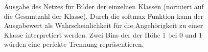 \begin{figure}[h!]
  \hspace{8pt}
  \hspace{8pt}
  \caption{Ausgabe des Netzes für Bilder der einzelnen Klassen (normiert auf die Gesamtzahl der Klasse). Durch die softmax Funktion kann der Ausgabewert als Wahrscheinlichkeit für die Angehörigkeit zu einer Klasse interpretiert werden. Zwei Bins der der Höhe 1 bei 0 und 1 würden eine perfekte Trennung repräsentieren.}
\end{figure}
%
